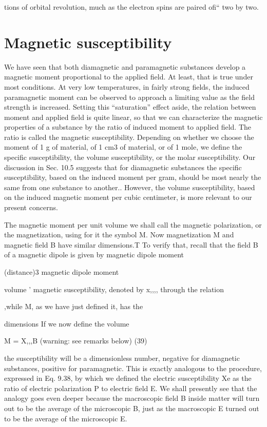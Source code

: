 tions of orbital revolution, much as the electron spins are paired ofi``
two by two.

\section{Magnetic susceptibility}

We have seen that both diamagnetic and paramagnetic substances
develop a magnetic moment proportional to the applied field. At
least, that is true under most conditions. At very low temperatures,
in fairly strong fields, the induced paramagnetic moment can be
observed to approach a limiting value as the field strength is 
increased. Setting this ``saturation'' effect aside, the relation between
moment and applied field is quite linear, so that we can characterize
the magnetic properties of a substance by the ratio of induced
moment to applied field. The ratio is called the magnetic 
susceptibility. Depending on whether we choose the moment of 1 g of
material, of 1 cm3 of material, or of 1 mole, we define the specific
susceptibility, the volume susceptibility, or the molar susceptibility.
Our discussion in Sec. 10.5 suggests that for diamagnetic substances
the specific susceptibility, based on the induced moment per gram,
should be most nearly the same from one substance to another..
However, the volume susceptibility, based on the induced magnetic
moment per cubic centimeter, is more relevant to our present
concerns.

The magnetic moment per unit volume we shall call the magnetic
polarization, or the magnetization, using for it the symbol M. Now
magnetization M and magnetic field B have similar dimensions.T
To verify that, recall that the field B of a magnetic dipole is given by
magnetic dipole moment

\begin{equation}
\end{equation}
(distance)3
magnetic dipole moment

volume '
magnetic susceptibility, denoted by x,,,, through the relation

,while M, as we have just defined it, has the

dimensions If we now define the volume

M = X,,,B (warning: see remarks below) (39)

the susceptibility will be a dimensionless number, negative for 
diamagnetic substances, positive for paramagnetic. This is exactly
analogous to the procedure, expressed in Eq. 9.38, by which we
defined the electric susceptibility Xe as the ratio of electric polarization
P to electric field E. We shall presently see that the analogy goes
even deeper because the macroscopic field B inside matter will turn
out to be the average of the microscopic B, just as the macroscopic E
turned out to be the average of the microscopic E.

